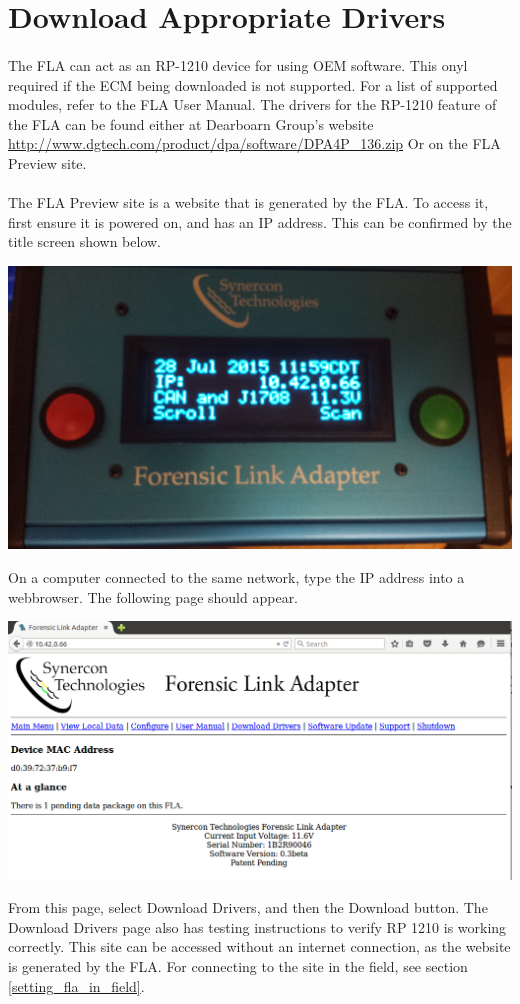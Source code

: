 \documentclass[11pt, oneside]{book}
\begin{document}
\section{Download Appropriate Drivers}
\paragraph{  }
The FLA can act as an RP-1210 device for using OEM software. This onyl required if the ECM being downloaded is not supported. For a list of supported modules, refer to the FLA User Manual. The drivers for the RP-1210 feature of the FLA can be found either at Dearboarn Group's website
\url{http://www.dgtech.com/product/dpa/software/DPA4P_136.zip} 
Or on the FLA Preview site.
\paragraph{  }
The FLA Preview site is a website that is generated by the FLA. To access it, first ensure it is powered on, and has an IP address. This can be confirmed by the title screen shown below.
\begin{center}
\includegraphics[width=0.5\linewidth]{../media/fla_screens/title_screen}\label{fig:fla_title_screen}
\end{center}
On a computer connected to the same network, type the IP address into a webbrowser. The following page should appear.
\begin{center}
\includegraphics[width=1\linewidth]{../media/fla_preview_screenshots/main_page}\label{fig:preview_main_page}
\end{center}
From this page, select Download Drivers, and then the Download button. The Download Drivers page also has testing instructions to verify RP 1210 is working correctly. This site can be accessed without an internet connection, as the website is generated by the FLA. For connecting to the site in the field, see section \ref{setting_fla_in_field}.
\end{document}
